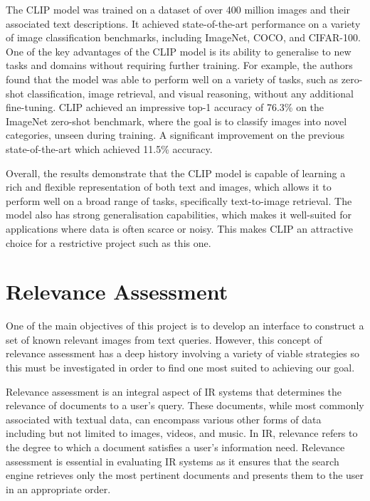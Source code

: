 \documentclass{l4proj}
\begin{document}
The CLIP model was trained on a dataset of over 400 million images and their associated text descriptions. It achieved state-of-the-art performance on a variety of image classification benchmarks, including ImageNet, COCO, and CIFAR-100. One of the key advantages of the CLIP model is its ability to generalise to new tasks and domains without requiring further training. For example, the authors found that the model was able to perform well on a variety of tasks, such as zero-shot classification, image retrieval, and visual reasoning, without any additional fine-tuning. CLIP achieved an impressive top-1 accuracy of 76.3\% on the ImageNet zero-shot benchmark, where the goal is to classify images into novel categories, unseen during training. A significant improvement on the previous state-of-the-art which achieved 11.5\% accuracy.

Overall, the results demonstrate that the CLIP model is capable of learning a rich and flexible representation of both text and images, which allows it to perform well on a broad range of tasks, specifically text-to-image retrieval. The model also has strong generalisation capabilities, which makes it well-suited for applications where data is often scarce or noisy. This makes CLIP an attractive choice for a restrictive project such as this one.


\section{Relevance Assessment}
One of the main objectives of this project is to develop an interface to construct a set of known relevant images from text queries. However, this concept of relevance assessment has a deep history involving a variety of viable strategies so this must be investigated in order to find one most suited to achieving our goal.

Relevance assessment is an integral aspect of IR systems that determines the relevance of documents to a user's query. These documents, while most commonly associated with textual data, can encompass various other forms of data including but not limited to images, videos, and music. In IR, relevance refers to the degree to which a document satisfies a user's information need. Relevance assessment is essential in evaluating IR systems as it ensures that the search engine retrieves only the most pertinent documents and presents them to the user in an appropriate order.
\end{document}

